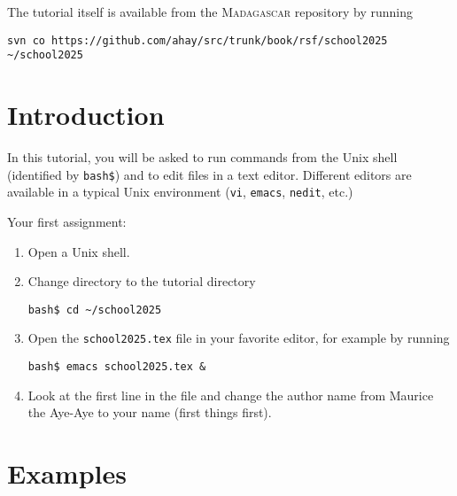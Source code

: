The tutorial itself is available from the \textsc{Madagascar} repository
by running
\begin{verbatim}
svn co https://github.com/ahay/src/trunk/book/rsf/school2025 ~/school2025
\end{verbatim}

\section{Introduction}

In this tutorial, you will be asked to run commands from the Unix
shell (identified by \texttt{bash\$}) and to edit files in a text
editor. Different editors are available in a typical Unix environment
(\texttt{vi}, \texttt{emacs}, \texttt{nedit}, etc.)

Your first assignment:
\begin{enumerate}
\item Open a Unix shell.
\item Change directory to the tutorial directory
\begin{verbatim}
bash$ cd ~/school2025
\end{verbatim}
\item Open the \texttt{school2025.tex} file in your favorite editor,
  for example by running
\begin{verbatim}
bash$ emacs school2025.tex & 
\end{verbatim}
\item Look at the first line in the file and change the author name
  from Maurice the Aye-Aye to your name (first things first).
\end{enumerate}

\section{Examples}
